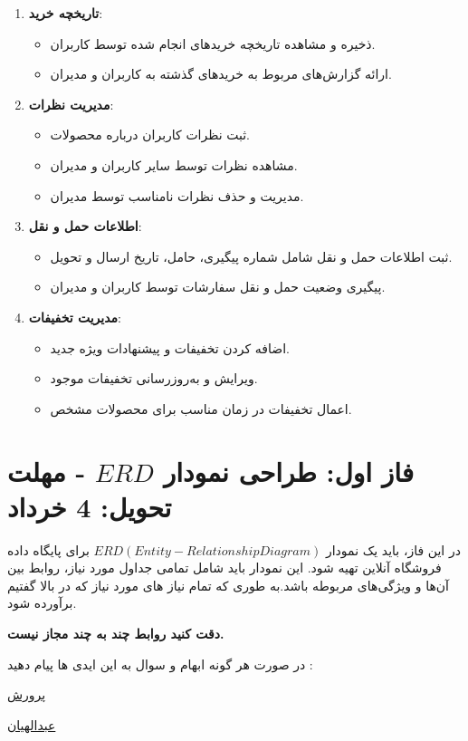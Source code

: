 \documentclass[12pt]{article}
\begin{document}
\begin{enumerate}
    \item \textbf{تاریخچه خرید}:
    \begin{itemize}
        \item ذخیره و مشاهده تاریخچه خریدهای انجام شده توسط کاربران.
        \item ارائه گزارش‌های مربوط به خریدهای گذشته به کاربران و مدیران.
    \end{itemize}
    \vspace{0.3cm}
    
    \item \textbf{مدیریت نظرات}:
    \begin{itemize}
        \item ثبت نظرات کاربران درباره محصولات.
        \item مشاهده نظرات توسط سایر کاربران و مدیران.
        \item مدیریت و حذف نظرات نامناسب توسط مدیران.
    \end{itemize}
    \vspace{0.3cm}
    
    \item \textbf{اطلاعات حمل و نقل}:
    \begin{itemize}
        \item ثبت اطلاعات حمل و نقل شامل شماره پیگیری، حامل، تاریخ ارسال و تحویل.
        \item پیگیری وضعیت حمل و نقل سفارشات توسط کاربران و مدیران.
    \end{itemize}
    \vspace{0.3cm}
    
    \item \textbf{مدیریت تخفیفات}:
    \begin{itemize}
        \item اضافه کردن تخفیفات و پیشنهادات ویژه جدید.
        \item ویرایش و به‌روزرسانی تخفیفات موجود.
        \item اعمال تخفیفات در زمان مناسب برای محصولات مشخص.
    \end{itemize}
    \vspace{0.3cm}
    

    

\end{enumerate}

\section{فاز اول: طراحی نمودار \(ERD\) - مهلت تحویل: 4 خرداد}
در این فاز، باید یک نمودار \(ERD (Entity-Relationship Diagram) \) برای پایگاه داده فروشگاه آنلاین تهیه شود. این نمودار باید شامل تمامی جداول مورد نیاز، روابط بین آن‌ها و ویژگی‌های مربوطه باشد.به طوری که تمام نیاز های مورد نیاز که در بالا گفتیم برآورده شود. 




\textbf{دقت کنید روابط چند به چند مجاز نیست.}

در صورت هر گونه ابهام و سوال به این ایدی ها پیام دهید :‌

\href{https://t.me/Ali_Abdollahian_Noghabi}{پرورش}

\href{https://t.me/parvvaresh}{‫ﻋﺒﺪﺍﻟﻬﻴﺎﻥ‬}
\end{document}
